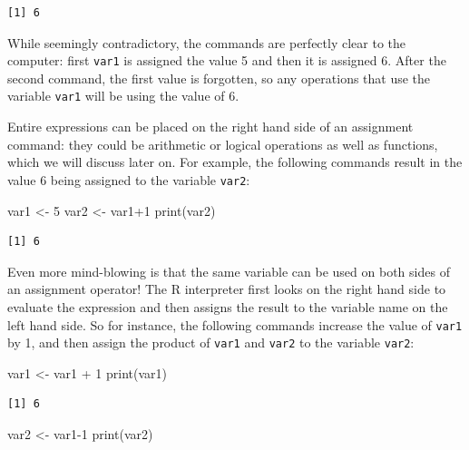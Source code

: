 \documentclass[
  letterpaper,
  DIV=11,
  numbers=noendperiod]{scrreprt}
\newenvironment{Shaded}{\begin{snugshade}}{\end{snugshade}}
\newcommand{\DecValTok}[1]{\textcolor[rgb]{0.68,0.00,0.00}{#1}}
\newcommand{\FunctionTok}[1]{\textcolor[rgb]{0.28,0.35,0.67}{#1}}
\newcommand{\NormalTok}[1]{\textcolor[rgb]{0.00,0.23,0.31}{#1}}
\newcommand{\OtherTok}[1]{\textcolor[rgb]{0.00,0.23,0.31}{#1}}
\newcommand{\SpecialCharTok}[1]{\textcolor[rgb]{0.37,0.37,0.37}{#1}}
\begin{document}
\begin{verbatim}
[1] 6
\end{verbatim}

While seemingly contradictory, the commands are perfectly clear to the
computer: first \texttt{var1} is assigned the value 5 and then it is
assigned 6. After the second command, the first value is forgotten, so
any operations that use the variable \texttt{var1} will be using the
value of 6.

Entire expressions can be placed on the right hand side of an assignment
command: they could be arithmetic or logical operations as well as
functions, which we will discuss later on. For example, the following
commands result in the value 6 being assigned to the variable
\texttt{var2}:

\begin{Shaded}
\begin{Highlighting}[]
\NormalTok{var1 }\OtherTok{\textless{}{-}} \DecValTok{5}
\NormalTok{var2 }\OtherTok{\textless{}{-}}\NormalTok{ var1}\SpecialCharTok{+}\DecValTok{1}
\FunctionTok{print}\NormalTok{(var2)}
\end{Highlighting}
\end{Shaded}

\begin{verbatim}
[1] 6
\end{verbatim}

Even more mind-blowing is that the same variable can be used on both
sides of an assignment operator! The R interpreter first looks on the
right hand side to evaluate the expression and then assigns the result
to the variable name on the left hand side. So for instance, the
following commands increase the value of \texttt{var1} by 1, and then
assign the product of \texttt{var1} and \texttt{var2} to the variable
\texttt{var2}:

\begin{Shaded}
\begin{Highlighting}[]
\NormalTok{var1 }\OtherTok{\textless{}{-}}\NormalTok{ var1 }\SpecialCharTok{+} \DecValTok{1}
\FunctionTok{print}\NormalTok{(var1)}
\end{Highlighting}
\end{Shaded}

\begin{verbatim}
[1] 6
\end{verbatim}

\begin{Shaded}
\begin{Highlighting}[]
\NormalTok{var2 }\OtherTok{\textless{}{-}}\NormalTok{ var1}\DecValTok{{-}1}
\FunctionTok{print}\NormalTok{(var2)}
\end{Highlighting}
\end{Shaded}
\end{document}
